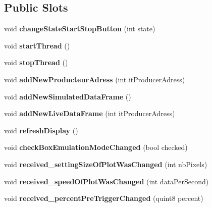 \subsection*{Public Slots}
\begin{DoxyCompactItemize}
\item 
\mbox{\label{class_main_window_a5b7d0d2c58e7703b36de9fa114594aa2}} 
void {\bfseries change\+State\+Start\+Stop\+Button} (int state)
\item 
\mbox{\label{class_main_window_a3a503f5106dd5b87c5bd928c4737016c}} 
void {\bfseries start\+Thread} ()
\item 
\mbox{\label{class_main_window_aafc67e8c9cf73d92af61e40afa8c8cf7}} 
void {\bfseries stop\+Thread} ()
\item 
\mbox{\label{class_main_window_a3b390a61c0a702f9575c96badffcfd9a}} 
void {\bfseries add\+New\+Producteur\+Adress} (int it\+Producer\+Adress)
\item 
\mbox{\label{class_main_window_a4bb8d1f31b7f995f630183bb4f0002ac}} 
void {\bfseries add\+New\+Simulated\+Data\+Frame} ()
\item 
\mbox{\label{class_main_window_ab2bdfc943e0f52024badf108de883a14}} 
void {\bfseries add\+New\+Live\+Data\+Frame} (int it\+Producer\+Adress)
\item 
\mbox{\label{class_main_window_ac61e0a61b28f15b9ad664357390b279e}} 
void {\bfseries refresh\+Display} ()
\item 
\mbox{\label{class_main_window_a12a5f75393b3aceebd8cd33c0ec47139}} 
void {\bfseries check\+Box\+Emulation\+Mode\+Changed} (bool checked)
\item 
\mbox{\label{class_main_window_a81a27d38753f97a2f4c65e5c0557581d}} 
void {\bfseries received\+\_\+setting\+Size\+Of\+Plot\+Was\+Changed} (int nb\+Pixels)
\item 
\mbox{\label{class_main_window_a545c5176da4bc0973da5ef1a084b237b}} 
void {\bfseries received\+\_\+speed\+Of\+Plot\+Was\+Changed} (int data\+Per\+Second)
\item 
\mbox{\label{class_main_window_accfc935e18af6ac6effee88c0c99378a}} 
void {\bfseries received\+\_\+percent\+Pre\+Trigger\+Changed} (quint8 percent)
\end{DoxyCompactItemize}

